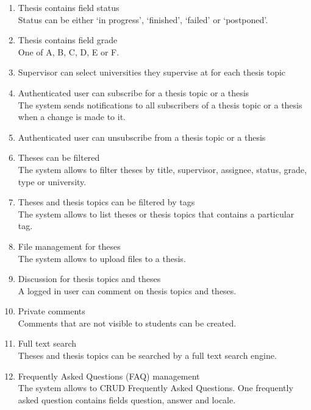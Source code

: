 \begin{enumerate}
    \item Thesis contains field status\\
    Status can be either `in progress', `finished', `failed' or `postponed'.

    \item Thesis contains field grade\\
    One of A, B, C, D, E or F.

    \item Supervisor can select universities they supervise at for each thesis topic

    \item Authenticated user can subscribe for a thesis topic or a thesis\\
    The system sends notifications to all subscribers of a thesis topic or a thesis when a change is made to it.

    \item Authenticated user can unsubscribe from a thesis topic or a thesis

    \item Theses can be filtered\\
    The system allows to filter theses by title, supervisor, assignee, status, grade, type or university.

    \item Theses and thesis topics can be filtered by tags\\
    The system allows to list theses or thesis topics that contains a particular tag.

    \item File management for theses\\
    The system allows to upload files to a thesis.

    \item Discussion for thesis topics and theses\\
    A logged in user can comment on thesis topics and theses.

    \item Private comments\\
    Comments that are not visible to students can be created.

    \item Full text search\\
    Theses and thesis topics can be searched by a full text search engine.

    \item Frequently Asked Questions (FAQ) management\\
    The system allows to CRUD Frequently Asked Questions. One frequently asked question contains fields question, answer and locale.

\end{enumerate}

